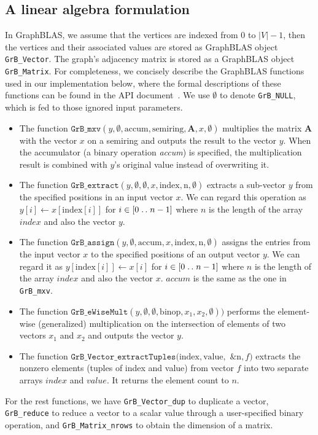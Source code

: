 \documentclass{sokendai_thesis} %
\newcommand{\isep}{\mathrel{{.}\,{.}}\nobreak}
\begin{document}
\subsection{A linear algebra formulation}
\label{sec:sv-graphblas}

In GraphBLAS, we assume that the vertices are indexed from $0$ to $|V|-1$, then the vertices and their associated values are stored as GraphBLAS object \texttt{GrB\_Vector}.
The graph's adjacency matrix is stored as a GraphBLAS object \texttt{GrB\_Matrix}.
For completeness, we concisely describe the GraphBLAS functions used in our implementation below, where the formal descriptions of these functions can be found in the API document~\cite{graphblas}.
We use $\emptyset$ to denote \texttt{GrB\_NULL}, which is fed to those ignored input parameters.
\begin{itemize}
\item
  The function $\texttt{GrB\_mxv}(\mathit{y}, \emptyset, \text{accum}, \text{semiring}, \mathbf{A}, \mathit{x}, \emptyset)$ multiplies the matrix $\mathbf{A}$ with the vector $\mathit{x}$ on a semiring and outputs the result to the vector $\mathit{y}$.
  When the accumulator (a binary operation \textit{accum}) is specified, the multiplication result is combined with $y$'s original value instead of overwriting it.
\item
  The function $\texttt{GrB\_extract}(\mathit{y}, \emptyset, \emptyset, \mathit{x}, \text{index}, \text{n}, \emptyset)$ extracts a sub-vector $y$ from the specified positions in an input vector $x$.
  We can regard this operation as $y[i]\leftarrow x[\text{index}[i]]$ for $i\in[0\isep n-1]$ where $n$ is the length of the array $\mathit{index}$ and also the vector $\mathit{y}$.
\item
  The function $\texttt{GrB\_assign}(\mathit{y}, \emptyset, \text{accum}, \mathit{x}, \text{index}, \text{n}, \emptyset)$ assigns the entries from the input vector $x$ to the specified positions of an output vector $y$.
  We can regard it as $y[\text{index}[i]]\leftarrow x[i]$ for $i\in[0\isep n-1]$ where $n$ is the length of the array $\mathit{index}$ and also the vector $x$.
  $\mathit{accum}$ is the same as the one in \texttt{GrB\_mxv}.
\item
  The function $\texttt{GrB\_eWiseMult}(\mathit{y}, \emptyset, \emptyset, \text{binop}, \mathit{x}_1, \mathit{x}_2, \emptyset))$ performs the element-wise (generalized) multiplication on the intersection of elements of two vectors $x_1$ and $x_2$ and outputs the vector $y$.
\item
  The function $\texttt{GrB\_Vector\_extractTuples}(\text{index}, \text{value},$ $\&\text{n}, f)$ extracts the nonzero elements (tuples of index and value) from vector $f$ into two separate arrays $\mathit{index}$ and $\mathit{value}$.
  It returns the element count to $n$.
\end{itemize}
For the rest functions, we have \texttt{GrB\_Vector\_dup} to duplicate a vector, \texttt{GrB\_reduce} to reduce a vector to a scalar value through a user-specified binary operation, and \texttt{GrB\_Matrix\_nrows} to obtain the dimension of a matrix.
\end{document}
